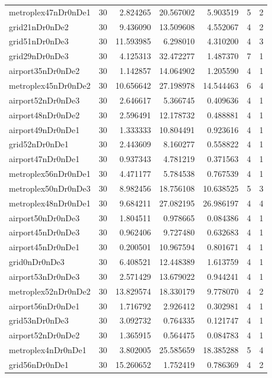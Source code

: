 \begin{longtable}{|l|r|r|r|r|r|r|}
metroplex47nDr0nDe1 & 30 & 2.824265 & 20.567002 & 5.903519 & 5 & 2 \\
grid21nDr0nDe2 & 30 & 9.436090 & 13.509608 & 4.552067 & 4 & 2 \\
grid51nDr0nDe3 & 30 & 11.593985 & 6.298010 & 4.310200 & 4 & 3 \\
grid29nDr0nDe3 & 30 & 4.125313 & 32.472277 & 1.487370 & 7 & 1 \\
airport35nDr0nDe2 & 30 & 1.142857 & 14.064902 & 1.205590 & 4 & 1 \\
metroplex45nDr0nDe2 & 30 & 10.656642 & 27.198978 & 14.544463 & 6 & 4 \\
airport52nDr0nDe3 & 30 & 2.646617 & 5.366745 & 0.409636 & 4 & 1 \\
airport48nDr0nDe2 & 30 & 2.596491 & 12.178732 & 0.488881 & 4 & 1 \\
airport49nDr0nDe1 & 30 & 1.333333 & 10.804491 & 0.923616 & 4 & 1 \\
grid52nDr0nDe1 & 30 & 2.443609 & 8.160277 & 0.558822 & 4 & 1 \\
airport47nDr0nDe1 & 30 & 0.937343 & 4.781219 & 0.371563 & 4 & 1 \\
metroplex56nDr0nDe1 & 30 & 4.471177 & 5.784538 & 0.767539 & 4 & 1 \\
metroplex50nDr0nDe3 & 30 & 8.982456 & 18.756108 & 10.638525 & 5 & 3 \\
metroplex48nDr0nDe1 & 30 & 9.684211 & 27.082195 & 26.986197 & 4 & 4 \\
airport50nDr0nDe3 & 30 & 1.804511 & 0.978665 & 0.084386 & 4 & 1 \\
airport45nDr0nDe3 & 30 & 0.962406 & 9.727480 & 0.632683 & 4 & 1 \\
airport45nDr0nDe1 & 30 & 0.200501 & 10.967594 & 0.801671 & 4 & 1 \\
grid0nDr0nDe3 & 30 & 6.408521 & 12.448389 & 1.613759 & 4 & 1 \\
airport53nDr0nDe3 & 30 & 2.571429 & 13.679022 & 0.944241 & 4 & 1 \\
metroplex52nDr0nDe2 & 30 & 13.829574 & 18.330179 & 9.778070 & 4 & 2 \\
airport56nDr0nDe1 & 30 & 1.716792 & 2.926412 & 0.302981 & 4 & 1 \\
grid53nDr0nDe3 & 30 & 3.092732 & 0.764335 & 0.121747 & 4 & 1 \\
airport52nDr0nDe2 & 30 & 1.365915 & 0.564475 & 0.084783 & 4 & 1 \\
metroplex4nDr0nDe1 & 30 & 3.802005 & 25.585659 & 18.385288 & 5 & 4 \\
grid56nDr0nDe1 & 30 & 15.260652 & 1.752419 & 0.786369 & 4 & 2 \\

\end{longtable}
